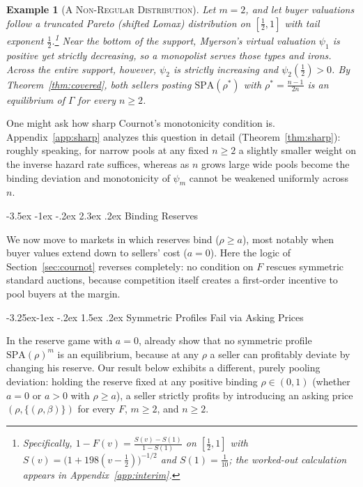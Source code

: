 \documentclass[12pt]{article}
\makeatletter
\newcommand{\citeasnoun}[1]{\citet{#1}}
\theoremstyle{mystyle}
\theoremstyle{mystyle2}
\newtheorem{example}{Example}
\newcommand{\mmpfont}{\scshape}
\renewcommand\section{\@startsection {section}{1}{\z@}%
                                   {-3.5ex \@plus -1ex \@minus -.2ex}%
                                   {2.3ex \@plus .2ex}%
                                   {\normalfont\large\mmpfont}}
\renewcommand\subsection{\@startsection{subsection}{2}{\z@}%
                                     {-3.25ex\@plus -1ex \@minus -.2ex}%
                                     {1.5ex \@plus .2ex}%
                                     {\normalfont\normalsize\mmpfont}}
\newcommand{\SPA}{\mathrm{SPA}}
\newcommand{\1}{\mathbf{1}}
\makeatother
\begin{document}
\begin{example}[\textsc{A Non-Regular Distribution}]\label{ex:pareto}
Let $m=2$, and let buyer valuations follow a truncated Pareto (shifted Lomax) distribution on $[\frac{1}{2},1]$ with tail exponent $\frac{1}{2}$.\footnote{Specifically, $1-F(v)=\frac{S(v)-S(1)}{1-S(1)}$ on $[\frac{1}{2},1]$ with $S(v)=\bigl(1+198(v-\frac{1}{2})\bigr)^{-1/2}$ and $S(1)=\frac{1}{10}$; the worked-out calculation appears in Appendix~\ref{app:interim}.} Near the bottom of the support, Myerson's virtual valuation $\psi_1$ is positive yet strictly decreasing, so a monopolist serves those types and irons. Across the entire support, however, $\psi_2$ is strictly increasing and $\psi_2(\frac{1}{2})>0$. By Theorem~\ref{thm:covered}, both sellers posting $\SPA(\rho^*)$ with $\rho^*=\frac{n-1}{2n}$ is an equilibrium of $\Gamma$ for every $n\ge 2$.
\end{example}

One might ask how sharp Cournot's monotonicity condition is. Appendix~\ref{app:sharp} analyzes this question in detail (Theorem~\ref{thm:sharp}): roughly speaking, for narrow pools at any fixed $n\ge 2$ a slightly smaller weight on the inverse hazard rate suffices, whereas as $n$ grows large wide pools become the binding deviation and monotonicity of $\psi_m$ cannot be weakened uniformly across~$n$.

\section{Binding Reserves} \label{sec:binding}

We now move to markets in which reserves bind ($\rho\ge a$), most notably when buyer values extend down to sellers' cost ($a=0$). Here the logic of Section~\ref{sec:cournot} reverses completely: no condition on $F$ rescues symmetric standard auctions, because competition itself creates a first-order incentive to pool buyers at the margin.

\subsection{Symmetric Profiles Fail via Asking Prices}

In the reserve game with $a=0$, \citeasnoun{burguet} already show that no symmetric profile $\SPA(\rho)^m$ is an equilibrium, because at any $\rho$ a seller can profitably deviate by changing his reserve. Our result below exhibits a different, purely pooling deviation: holding the reserve fixed at any positive binding $\rho\in(0,1)$ (whether $a=0$ or $a>0$ with $\rho\ge a$), a seller strictly profits by introducing an asking price $(\rho,\{(\rho,\beta)\})$ for every $F$, $m\ge 2$, and $n\ge 2$.
\end{document}
